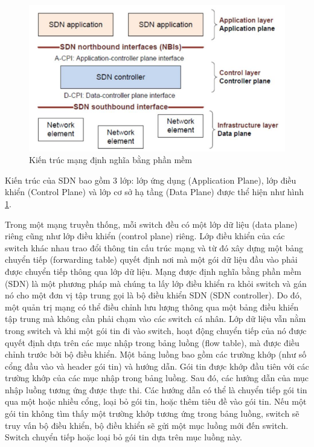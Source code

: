 \documentclass[a4paper]{article}
\begin{document}
\begin{figure}
    \centering
    \includegraphics[width=0.7\linewidth]{images/sdn.png}
    \caption{Kiến trúc mạng định nghĩa bằng phần mềm}
    \label{fig:sdn}
\end{figure}
Kiến trúc của SDN bao gồm 3 lớp: lớp ứng dụng (Application Plane), lớp điều khiển (Control Plane) và lớp cơ sở hạ tầng (Data Plane) được thể hiện như hình \ref{fig:sdn}.

Trong một mạng truyền thống, mỗi switch đều có một lớp dữ liệu (data plane) riêng cũng như lớp điều khiển (control plane) riêng. Lớp điều khiển của các switch khác nhau trao đổi thông tin cấu trúc mạng và từ đó xây dựng một bảng chuyển tiếp (forwarding table) quyết định nơi mà một gói dữ liệu đầu vào phải được chuyển tiếp thông qua lớp dữ liệu. Mạng được định nghĩa bằng phần mềm (SDN) là một phương pháp mà chúng ta lấy lớp điều khiển ra khỏi switch và gán nó cho một đơn vị tập trung gọi là bộ điều khiển SDN (SDN controller). Do đó, một quản trị mạng có thể điều chỉnh lưu lượng thông qua một bảng điều khiển tập trung mà không cần phải chạm vào các switch cá nhân. Lớp dữ liệu vẫn nằm trong switch và khi một gói tin đi vào switch, hoạt động chuyển tiếp của nó được quyết định dựa trên các mục nhập trong bảng luồng (flow table), mà được điều chỉnh trước bởi bộ điều khiển. Một bảng luồng bao gồm các trường khớp (như số cổng đầu vào và header gói tin) và hướng dẫn. Gói tin được khớp đầu tiên với các trường khớp của các mục nhập trong bảng luồng. Sau đó, các hướng dẫn của mục nhập luồng tương ứng được thực thi. Các hướng dẫn có thể là chuyển tiếp gói tin qua một hoặc nhiều cổng, loại bỏ gói tin, hoặc thêm tiêu đề vào gói tin. Nếu một gói tin không tìm thấy một trường khớp tương ứng trong bảng luồng, switch sẽ truy vấn bộ điều khiển, bộ điều khiển sẽ gửi một mục luồng mới đến switch. Switch chuyển tiếp hoặc loại bỏ gói tin dựa trên mục luồng này\cite{geeksforgeeks_sdn}.
\end{document}
